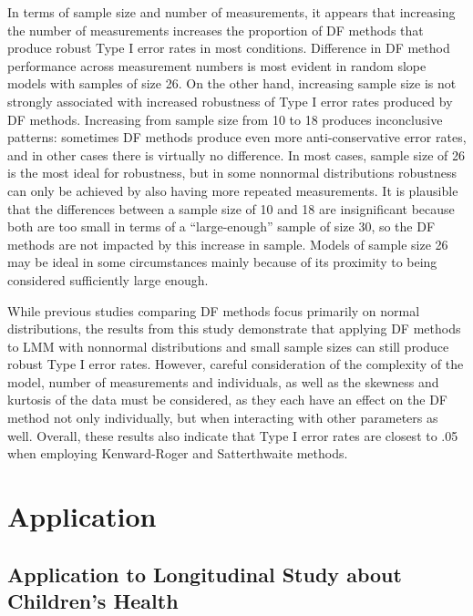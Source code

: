 \documentclass[12pt, twoside]{amherstthesis}
\begin{document}
In terms of sample size and number of measurements, it appears that increasing the number of measurements increases the proportion of DF methods that produce robust Type I error rates in most conditions. Difference in DF method performance across measurement numbers is most evident in random slope models with samples of size 26. On the other hand, increasing sample size is not strongly associated with increased robustness of Type I error rates produced by DF methods. Increasing from sample size from 10 to 18 produces inconclusive patterns: sometimes DF methods produce even more anti-conservative error rates, and in other cases there is virtually no difference. In most cases, sample size of 26 is the most ideal for robustness, but in some nonnormal distributions robustness can only be achieved by also having more repeated measurements. It is plausible that the differences between a sample size of 10 and 18 are insignificant because both are too small in terms of a ``large-enough'' sample of size 30, so the DF methods are not impacted by this increase in sample. Models of sample size 26 may be ideal in some circumstances mainly because of its proximity to being considered sufficiently large enough.

While previous studies comparing DF methods focus primarily on normal distributions, the results from this study demonstrate that applying DF methods to LMM with nonnormal distributions and small sample sizes can still produce robust Type I error rates. However, careful consideration of the complexity of the model, number of measurements and individuals, as well as the skewness and kurtosis of the data must be considered, as they each have an effect on the DF method not only individually, but when interacting with other parameters as well. Overall, these results also indicate that Type I error rates are closest to .05 when employing Kenward-Roger and Satterthwaite methods.

\hypertarget{math-sci}{%
\chapter{Application}\label{math-sci}}

\hypertarget{application-to-longitudinal-study-about-childrens-health}{%
\section{Application to Longitudinal Study about Children's Health}\label{application-to-longitudinal-study-about-childrens-health}}
\end{document}
